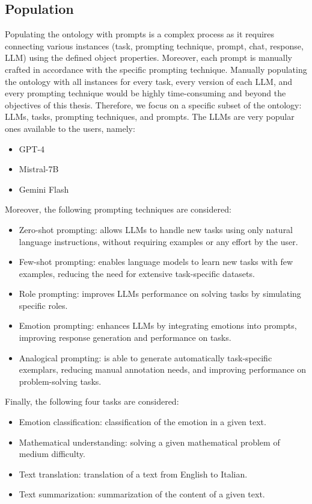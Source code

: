 \subsection{Population}
\label{subsection:4_3_6_population}
Populating the ontology with prompts is a complex process as it requires connecting various instances (task, prompting technique, prompt, chat, response, LLM) using the defined object properties. Moreover, each prompt is manually crafted in accordance with the specific prompting technique.
Manually populating the ontology with all instances for every task, every version of each LLM, and every prompting technique would be highly time-consuming and beyond the objectives of this thesis.
Therefore, we focus on a specific subset of the ontology: LLMs, tasks, prompting techniques, and prompts.
The LLMs are very popular ones available to the users, namely:
\begin{itemize}
    \item GPT-4
    \item Mistral-7B
    \item Gemini Flash
\end{itemize}
Moreover, the following prompting techniques are considered:
\begin{itemize}
    \item Zero-shot prompting: allows LLMs to handle new tasks using only natural language instructions, without requiring examples or any effort by the user.

    \item Few-shot prompting: enables language models to learn new tasks with few examples, reducing the need for extensive task-specific datasets.
    
    \item Role prompting: improves LLMs performance on solving tasks by simulating specific roles.

    \item Emotion prompting:  enhances LLMs by integrating emotions into prompts, improving response generation and performance on tasks.

    \item Analogical prompting: is able to generate automatically task-specific exemplars, reducing manual annotation needs, and improving performance on problem-solving tasks.
\end{itemize}
Finally, the following four tasks are considered:
\begin{itemize}
    \item Emotion classification: classification of the emotion in a given text.

    \item Mathematical understanding: solving a given mathematical problem of medium difficulty. 

    \item Text translation: translation of a text from English to Italian.

    \item Text summarization: summarization of the content of a given text.
\end{itemize}

